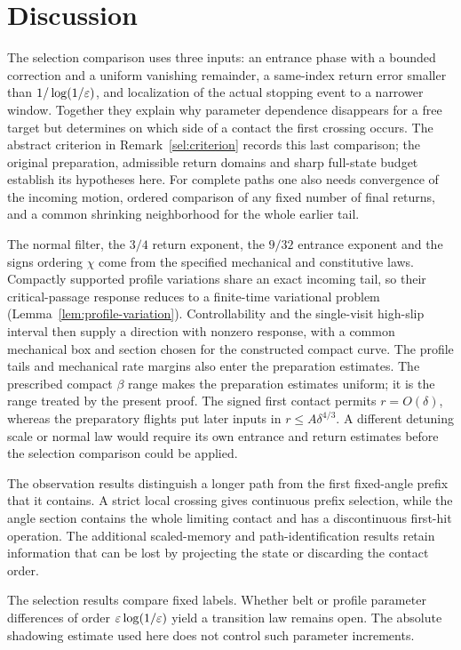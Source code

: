\section{Discussion}
\label{sec:discussion}

The selection comparison uses three inputs: an entrance phase with
a bounded correction and a uniform vanishing remainder, a same-index
return error smaller
than $1/\log(1/\varepsilon)$, and localization of the actual stopping
event to a narrower window. Together they explain why parameter
dependence disappears for a free target but determines on which
side of a contact the first crossing occurs. The abstract criterion
in Remark~\ref{sel:criterion} records this last comparison;
the original preparation, admissible return domains and sharp
full-state budget establish its hypotheses here. For complete
paths one also needs convergence of the incoming motion, ordered
comparison of any fixed number of final returns, and a common
shrinking neighborhood for the whole earlier tail.

The normal filter, the $3/4$ return exponent, the $9/32$ entrance
exponent and the signs ordering $\chi$ come from the specified
mechanical and constitutive laws. Compactly supported profile
variations share an exact incoming tail, so their critical-passage
response reduces to a finite-time variational problem
(Lemma~\ref{lem:profile-variation}). Controllability and the
single-visit high-slip interval then supply a direction with nonzero
response, with a common mechanical box and section chosen for the
constructed compact curve. The profile tails and mechanical rate
margins also enter the preparation estimates. The prescribed compact $\beta$ range makes the preparation
estimates uniform; it is the range treated by the present proof.
The signed first contact permits $r=O(\delta)$, whereas the
preparatory flights put later inputs in $r\le A\delta^{4/3}$.
A different detuning scale or normal law would require its own
entrance and return estimates before the selection comparison
could be applied.

The observation results distinguish a longer path from the first
fixed-angle prefix that it contains. A strict local crossing gives
continuous prefix selection, while the angle section contains the
whole limiting contact and has a discontinuous first-hit operation.
The additional scaled-memory and path-identification results retain
information that can be lost by projecting the state or discarding
the contact order.

The selection results compare fixed labels. Whether belt or profile
parameter differences of order $\varepsilon\log(1/\varepsilon)$ yield a transition
law remains open. The absolute shadowing estimate used here does
not control such parameter increments.
